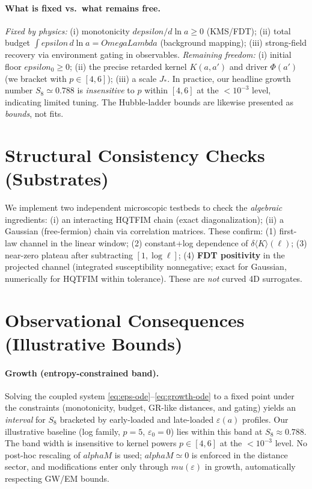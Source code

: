 \documentclass[aps,prd,onecolumn,superscriptaddress,nofootinbib]{revtex4-2}
\def\OmL{OmegaLambda}%
\def\eps{epsilon}%
\def\mu{mu}%
\def\alpha{alpha}%
\def\alpha_M{alphaM}%
\def\Omega_\Lambda{OmegaLambda}%
\providecommand{\OmL}{\Omega_\Lambda}
\providecommand{\eps}{\varepsilon}
\begin{document}
\paragraph{What is fixed vs.\ what remains free.}
\emph{Fixed by physics:} (i) monotonicity \(d\eps/d\ln a\ge 0\) (KMS/FDT); (ii) total budget \(\int \eps\, d\ln a=\OmL\) (background mapping); (iii) strong-field recovery via environment gating in observables. \emph{Remaining freedom:} (i) initial floor \(\eps_0\ge 0\); (ii) the precise retarded kernel \(K(a,a')\) and driver \(\Phi(a')\) (we bracket with \(p\in[4,6]\)); (iii) a scale \(J_*\). In practice, our headline growth number \(S_8\simeq 0.788\) is \emph{insensitive} to \(p\) within \([4,6]\) at the \(<10^{-3}\) level, indicating limited tuning. The Hubble-ladder bounds are likewise presented as \emph{bounds}, not fits.

\section{Structural Consistency Checks (Substrates)}
\label{sec:substrates}
We implement two independent microscopic testbeds to check the \emph{algebraic} ingredients: (i) an interacting HQTFIM chain (exact diagonalization); (ii) a Gaussian (free-fermion) chain via correlation matrices. These confirm: (1) first-law channel in the linear window; (2) constant+log dependence of \(\delta\!\langle K\rangle(\ell)\); (3) near-zero plateau after subtracting \([1,\log \ell]\); (4) \textbf{FDT positivity} in the projected channel (integrated susceptibility nonnegative; exact for Gaussian, numerically for HQTFIM within tolerance). These are \emph{not} curved 4D surrogates.

\section{Observational Consequences (Illustrative Bounds)}
\label{sec:obs}
\paragraph{Growth (entropy-constrained band).}
Solving the coupled system \eqref{eq:eps-ode}--\eqref{eq:growth-ode} to a fixed point under the constraints (monotonicity, budget, GR-like distances, and gating) yields an \emph{interval} for \(S_8\) bracketed by early-loaded and late-loaded \(\varepsilon(a)\) profiles. Our illustrative baseline (log family, \(p=5\), \(\varepsilon_0=0\)) lies within this band at \(S_8\approx 0.788\). The band width is insensitive to kernel powers \(p\in[4,6]\) at the \(<10^{-3}\) level. No post-hoc rescaling of \(\alpha_M\) is used; \(\alpha_M\simeq 0\) is enforced in the distance sector, and modifications enter only through \(\mu(\varepsilon)\) in growth, automatically respecting GW/EM bounds.
\end{document}
